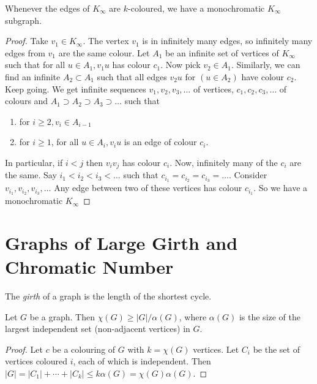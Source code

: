 \documentclass[a3paper, 10pt]{article}
\renewcommand{\vocab}[1]{\emph{#1}}
\begin{document}
\begin{multicols*}{5}
\begin{theorem}
    Whenever the edges of $K_{\infty}$ are $k$-coloured, we have a monochromatic $K_{\infty}$ subgraph.
\end{theorem}
\begin{proof}
Take $v_1 \in K_{\infty}$. The vertex $v_1$ is in infinitely many edges, so infinitely many edges from $v_1$ are the same colour. Let $A_1$ be an infinite set of vertices of $K_{\infty}$ such that for all $u \in A_1, v_1 u$ has colour $c_1$. Now pick $v_2 \in A_1$. Similarly, we can find an infinite $A_2 \subset A_1$ such that all edges $v_2 u$ for $\left(u \in A_2\right)$ have colour $c_2$. Keep going. We get infinite sequences $v_1, v_2, v_3, \ldots$ of vertices, $c_1, c_2, c_3, \ldots$ of colours and $A_1 \supset A_2 \supset A_3 \supset \ldots$ such that
\begin{enumerate}
    \item for $i \geq 2, v_i \in A_{i-1}$
    \item for $i \geq 1$, for all $u \in A_i, v_i u$ is an edge of colour $c_i$.
\end{enumerate}
In particular, if $i<j$ then $v_i v_j$ has colour $c_i$. Now, infinitely many of the $c_i$ are the same. Say $i_1<i_2<i_3<\ldots$ such that $c_{i_1}=c_{i_2}=c_{i_3}=\ldots$. Consider $v_{i_1}, v_{i_2}, v_{i_3}, \ldots$ Any edge between two of these vertices has colour $c_{i_1}$. So we have a monochromatic $K_{\infty}$
\end{proof}

\section{Graphs of Large Girth and Chromatic Number}

\begin{definition}
    The \vocab{girth} of a graph is the length of the shortest cycle.
\end{definition}

\begin{proposition}
    Let $G$ be a graph. Then $\chi(G) \geq |G|/\alpha(G)$, where $\alpha(G)$ is the size of the largest independent set (non-adjacent vertices) in $G$.
\end{proposition}
\begin{proof}
    Let $c$ be a colouring of $G$ with $k = \chi(G)$ vertices. Let $C_i$ be the set of vertices coloured $i$, each of which is independent. Then $|G| = |C_1| + \cdots + |C_k| \leq k \alpha(G) = \chi(G) \alpha(G)$.
\end{proof}


\end{multicols*}
\end{document}
